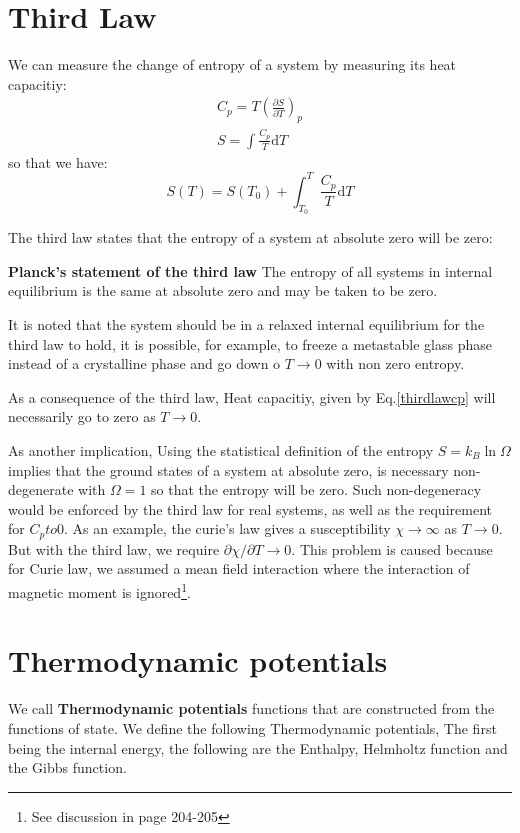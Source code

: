 \documentclass{article}
\newcommand{\pfrac}[2]{\frac{\partial #1}{\partial #2}}
\newcommand{\dnor}{\text{d}}
\begin{document}
\section{Third Law}
We can measure the change of entropy of a system by measuring its heat capacitiy:
\begin{gather}
    C_p = T\left(\pfrac{S}{T}\right)_p \label{thirdlawcp}\\
    S = \int \frac{C_p}{T} \dnor T
\end{gather}
so that we have:
\begin{equation}
    S(T) = S(T_0) + \int_{T_0}^{T} \frac{C_p}{T} \dnor T
\end{equation}

The third law states that the entropy of a system at absolute zero will be zero:

\textbf{Planck's statement of the third law} The entropy of all systems in internal
equilibrium is the same at absolute zero and may be taken to be zero.

It is noted that the system should be in a relaxed internal equilibrium for the third law
to hold, it is possible,
for example, to freeze a metastable glass phase instead of a crystalline phase and go down
o $T \to 0$ with non zero entropy.

As a consequence of the third law, Heat capacitiy, given by Eq.\ref{thirdlawcp} will
necessarily go to zero as $T\to0$.

As another implication, Using the statistical definition of the entropy $S = k_B \ln \Omega$
implies that the ground states of a system at absolute zero, is necessary non-degenerate with
$\Omega = 1$ so that the entropy will be zero. Such non-degeneracy would be enforced by the 
third law for real systems, as well as the requirement for $C_pto 0$. 
As an example, the curie's law gives a susceptibility $\chi \to \infty$ as $T \to 0$. But with
the third law, we require $\partial \chi / \partial T \to 0$. This problem is caused because
for Curie law, we assumed a mean field interaction where the interaction of magnetic
moment is ignored\footnote{See discussion in page 204-205}. 

\section{Thermodynamic potentials}
We call \textbf{Thermodynamic potentials} functions that are constructed from 
the functions of state. 
We define the following Thermodynamic potentials, The first being the internal 
energy, the following are the Enthalpy, Helmholtz function and the Gibbs 
function.
\end{document}
